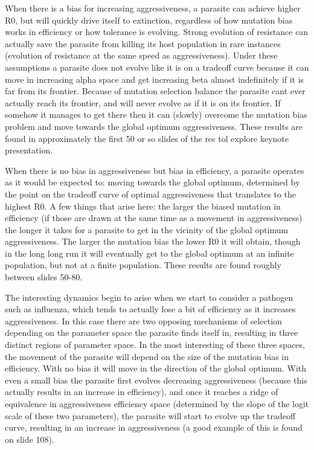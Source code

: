 When there is a bias for increasing aggressiveness, a parasite can achieve higher R0, but will quickly drive itself to extinction, regardless of how mutation bias works in efficiency or how tolerance is evolving. Strong evolution of resistance can actually save the parasite from killing its host population in rare instances (evolution of resistance at the same speed as aggressiveness). Under these assumptions a parasite does not evolve like it is on a tradeoff curve because it can move in increasing alpha space and get increasing beta almost indefinitely if it is far from its frontier. Because of mutation selection balance the parasite cant ever actually reach its frontier, and will never evolve as if it is on its frontier. If somehow it manages to get there then it can (slowly) overcome the mutation bias problem and move towards the global optimum aggressiveness. These results are found in approximately the first 50 or so slides of the res tol explore keynote presentation.

When there is no bias in aggressiveness but bias in efficiency, a parasite operates as it would be expected to: moving towards the global optimum, determined by the point on the tradeoff curve of optimal aggressiveness that translates to the highest R0. A few things that arise here: the larger the biased mutation in efficiency (if those are drawn at the same time as a movement in aggressiveness) the longer it takes for a parasite to get in the vicinity of the global optimum aggressiveness. The larger the mutation bias the lower R0 it will obtain, though in the long long run it will eventually get to the global optimum at an infinite population, but not at a finite population. These results are found roughly between slides 50-80.

The interesting dynamics begin to arise when we start to consider a pathogen such as influenza, which tends to actually lose a bit of efficiency as it increases aggressiveness. In this case there are two opposing mechanisms of selection depending on the parameter space the parasite finds itself in, resulting in three distinct regions of parameter space. In the most interesting of these three spaces, the movement of the parasite will depend on the size of the mutation bias in efficiency. With no bias it will move in the direction of the global optimum. With even a small bias the parasite first evolves decreasing aggressiveness (because this actually results in an increase in efficiency), and once it reaches a ridge of equivalence in aggressiveness efficiency space (determined by the slope of the logit scale of these two parameters), the parasite will start to evolve up the tradeoff curve, resulting in an increase in aggressiveness (a good example of this is found on slide 108).

